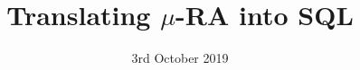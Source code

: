 \documentclass{beamer}
\newcommand{\mus}{{$\mu$-RA}}
\newcommand{\fixpt}[2][X]{\mu {\left(#1=#2\right)}}
\newcommand*\blue[1]{{\color{blue}#1}}
\newcommand*\dblue[1]{{\color{darkblue}#1}}
\newcommand*\green[1]{{\color{darkgreen}#1}}
\begin{document}
\title{Translating \mus{} into SQL}
\date{3rd October 2019}









\end{document}
